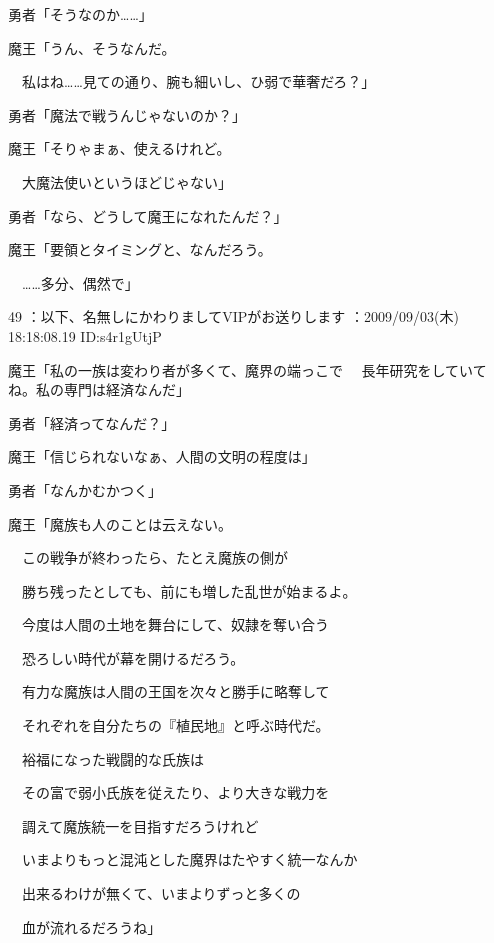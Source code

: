 \documentclass[a4j,twocolumn]{tarticle}
\begin{document}
勇者「そうなのか……」 



魔王「うん、そうなんだ。\par{} 
　私はね……見ての通り、腕も細いし、ひ弱で華奢だろ？」 



勇者「魔法で戦うんじゃないのか？」\par{} 
魔王「そりゃまぁ、使えるけれど。\par{} 
　大魔法使いというほどじゃない」 



勇者「なら、どうして魔王になれたんだ？」 



魔王「要領とタイミングと、なんだろう。\par{} 
　……多分、偶然で」 

	
    
    

49 ：以下、名無しにかわりましてVIPがお送りします ：2009/09/03(木) 18:18:08.19 ID:s4r1gUtjP 


魔王「私の一族は変わり者が多くて、魔界の端っこで 
　長年研究をしていてね。私の専門は経済なんだ」 



勇者「経済ってなんだ？」 



魔王「信じられないなぁ、人間の文明の程度は」\par{} 
勇者「なんかむかつく」 



魔王「魔族も人のことは云えない。\par{} 
　この戦争が終わったら、たとえ魔族の側が\par{} 
　勝ち残ったとしても、前にも増した乱世が始まるよ。\par{} 
　今度は人間の土地を舞台にして、奴隷を奪い合う\par{} 
　恐ろしい時代が幕を開けるだろう。\par{} 
　有力な魔族は人間の王国を次々と勝手に略奪して\par{} 
　それぞれを自分たちの『植民地』と呼ぶ時代だ。\par{} 
　裕福になった戦闘的な氏族は\par{} 
　その富で弱小氏族を従えたり、より大きな戦力を \par{}
　調えて魔族統一を目指すだろうけれど\par{} 
　いまよりもっと混沌とした魔界はたやすく統一なんか \par{}
　出来るわけが無くて、いまよりずっと多くの \par{}
　血が流れるだろうね」 
\end{document}
